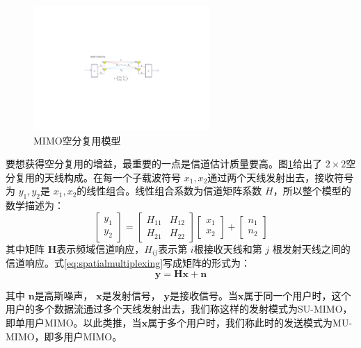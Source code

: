 \documentclass[10pt,a4paper,UTF8]{article}
\begin{document}
\begin{figure}[htb]
\centering
\includegraphics[width=0.6\textwidth]{../../img/20151106msm.pdf}
\caption{\label{fig:orgparagraph14}
MIMO空分复用模型}
\end{figure}


要想获得空分复用的增益，最重要的一点是信道估计质量要高。图\ref{fig:orgparagraph14}给出了 \(2\times 2\)空分复用的天线构成。在每一个子载波符号 \(x_{1},x_{2}\)通过两个天线发射出去，接收符号为 \(y_{1},y_{2}\)是 \(x_{1},x_{2}\)的线性组合。线性组合系数为信道矩阵系数 \(H\)，所以整个模型的数学描述为：
\begin{equation}
\label{eq:spatialmultiplexing}
\begin{bmatrix}
y_{1} \\ y_{2}
\end{bmatrix}
=
\begin{bmatrix}
H_{11}& H_{12} \\
H_{21}& H_{22}
\end{bmatrix}
\begin{bmatrix}
x_{1} \\ x_{2}
\end{bmatrix}
+
\begin{bmatrix}
n_{1} \\ n_{2}
\end{bmatrix}
\end{equation}
其中矩阵 \(\mathbf{H}\)表示频域信道响应，\(H_{ij}\)表示第 \(i\)根接收天线和第 \(j\) 根发射天线之间的信道响应。式\ref{eq:spatialmultiplexing}写成矩阵的形式为：
\begin{equation}
\label{eq:mimospatial}
\mathbf{y} = \mathbf{Hx} + \mathbf{n}
\end{equation}

其中 \(\mathbf{n}\)是高斯噪声， \(\mathbf{x}\)是发射信号， \(\mathbf{y}\)是接收信号。当\(\mathbf{x}\)属于同一个用户时，这个用户的多个数据流通过多个天线发射出去，我们称这样的发射模式为SU-MIMO，即单用户MIMO。以此类推，当\(\mathbf{x}\)属于多个用户时，我们称此时的发送模式为MU-MIMO，即多用户MIMO。
\end{document}
